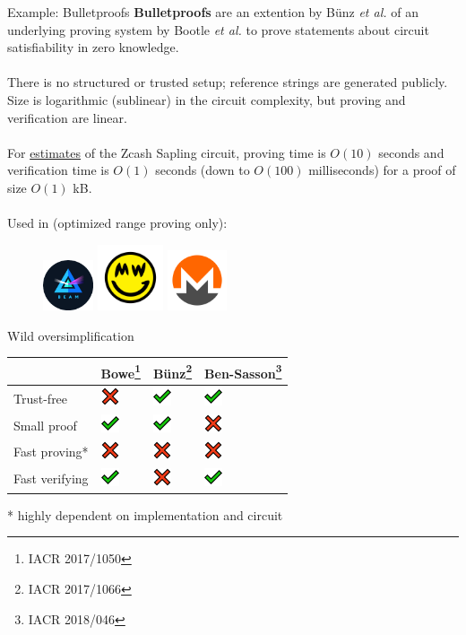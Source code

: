 \documentclass[aspectratio=169]{beamer}
\newcommand{\yicon}{\includegraphics[width=20px]{icon-check.png}}
\newcommand{\nicon}{\includegraphics[width=20px]{icon-cross.png}}
\begin{document}
\begin{frame}{Example: Bulletproofs}
\textbf{Bulletproofs} are an extention by B\"{u}nz \textit{et al.} of an underlying proving system by Bootle \textit{et al.} to prove statements about circuit satisfiability in zero knowledge. \\~\\

There is no structured or trusted setup; reference strings are generated publicly. Size is logarithmic (sublinear) in the circuit complexity, but proving and verification are linear. \\~\\

For \underline{estimates} of the Zcash Sapling circuit, proving time is $O(10)$ seconds and verification time is $O(1)$ seconds (down to $O(100)$ milliseconds) for a proof of size $O(1)$ kB. \\~\\

Used in (optimized range proving only):
\begin{figure}
\includegraphics[align=c,height=42pt]{logo-beam.png}
\includegraphics[align=c,height=55pt]{logo-grin.png}
\includegraphics[align=c,height=50pt]{logo-monero.png}
\end{figure}
\end{frame}


\begin{frame}{Wild oversimplification}
\begin{table}
\centering
\begin{tabular}{>{\arraybackslash}m{1.0in} >{\arraybackslash}m{0.5in} >{\arraybackslash}m{0.5in} >{\arraybackslash}m{1.0in}}
& Bowe\footnote{IACR 2017/1050} & B\"{u}nz\footnote{IACR 2017/1066} & Ben-Sasson\footnote{IACR 2018/046} \\
\hline
Trust-free & \nicon & \yicon & \yicon \\
Small proof & \yicon & \yicon & \nicon \\
Fast proving* & \nicon & \nicon & \nicon \\
Fast verifying & \yicon & \nicon & \yicon
\end{tabular}
\end{table}
\begin{center}
* highly dependent on implementation and circuit
\end{center}
\end{frame}
\end{document}
